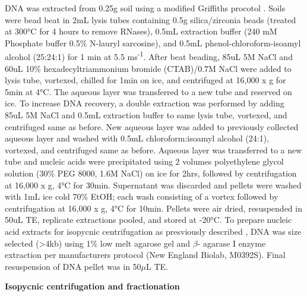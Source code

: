 DNA was extracted from 0.25g soil using a modified Griffiths procotol \cite{Griffiths_2000}.  Soils were bead beat in 2mL lysis tubes containing 0.5g silica/zirconia beads (treated at 300°C for 4 hours to remove RNases), 0.5mL extraction buffer (240 mM Phosphate buffer
0.5\% N-lauryl sarcosine), and 0.5mL phenol-chloroform-isoamyl alcohol (25:24:1) for 1 min at 5.5 ms\textsuperscript{-1}. After beat beading, 85uL 5M NaCl and 60uL 10\% hexadecyltriammonium bromide (CTAB)/0.7M NaCl were added to lysis tube, vortexed, chilled for 1min on ice, and centrifuged at 16,000 x g for 5min at 4°C.  The aqueous layer was transferred to a new tube and reserved on ice.  To increase DNA recovery, a double extraction was performed by adding 85uL 5M NaCl and 0.5mL extraction buffer to same lysis tube, vortexed, and centrifuged same as before.  New aqueous layer was added to previously collected aqueous layer and washed with 0.5mL chloroform:isoamyl alcohol (24:1), vortexed, and centrifuged same as before.  Aqueous layer was transferred to a new tube and nucleic acids were precipitated using 2 volumes polyethylene glycol solution (30\% PEG 8000, 1.6M NaCl) on ice for 2hrs, followed by centrifugation at 16,000 x g, 4°C for 30min.  Supernatant was discarded and pellets were washed with 1mL ice cold 70\% EtOH; each wash consisting of a vortex followed by centrifugation at 16,000 x g, 4°C for 10min.  Pellets were air dried, resuspended in 50uL TE, replicate extractions pooled, and stored at -20°C. To prepare nucleic acid extracts for isopycnic centrifugation as presviously described \cite{Buckley_2007}, DNA was size selected (>4kb) using 1\% low melt agarose gel and $\beta$- agarase I enzyme extraction per manufacturers protocol (New England Biolab, M0392S).  Final resuspension of DNA pellet was in 50$\mu$L TE.   


\textbf{Isopycnic centrifugation and fractionation}

